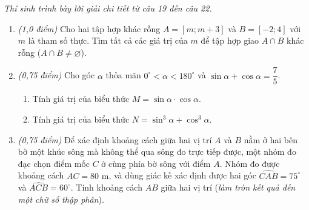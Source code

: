 \documentclass[12pt,a4paper]{article}
\newcommand{\parttitle}[1]{\par\vspace{2pt}{\large\bfseries\color{ink}#1}\par\vspace{1pt}}
\begin{document}
\parttitle{PHẦN IV. Tự luận}
\textit{Thí sinh trình bày lời giải chi tiết từ câu 19 đến câu 22.}
\begin{enumerate}[resume]
\item \textit{(1,0 điểm)} Cho hai tập hợp khác rỗng $A = [m; m + 3]$ và $B = [-2; 4]$ với $m$ là tham số thực. Tìm tất cả các giá trị của $m$ để tập hợp giao $A \cap B$ khác rỗng ($A \cap B \ne \varnothing$).

\item \textit{(0,75 điểm)} Cho góc $\alpha$ thỏa mãn $0^\circ < \alpha < 180^\circ$ và $\sin \alpha + \cos \alpha = \dfrac{7}{5}$.
\begin{enumerate}
    \item Tính giá trị của biểu thức $M = \sin \alpha \cdot \cos \alpha$.
    \item Tính giá trị của biểu thức $N = \sin^3 \alpha + \cos^3 \alpha$.
\end{enumerate}

\item \begin{minipage}[t]{0.58\linewidth}
\textit{(0,75 điểm)} Để xác định khoảng cách giữa hai vị trí $A$ và $B$ nằm ở hai bên bờ một khúc sông mà không thể qua sông đo trực tiếp được, một nhóm đo đạc chọn điểm mốc $C$ ở cùng phía bờ sông với điểm $A$. Nhóm đo được khoảng cách $AC = 80\text{ m}$, và dùng giác kế xác định được hai góc $\widehat{CAB} = 75^\circ$ và $\widehat{ACB} = 60^\circ$. Tính khoảng cách $AB$ giữa hai vị trí (\textit{làm tròn kết quả đến một chữ số thập phân}).
\end{minipage}\hfill
\begin{minipage}[t]{0.38\linewidth}
\centering
{}
\end{minipage}
\end{enumerate}
\end{document}
